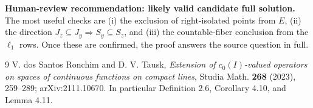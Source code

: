 \documentclass[11pt]{article}
\begin{document}
\textbf{Human-review recommendation: likely valid candidate full solution.}
The most useful checks are (i) the exclusion of right-isolated points from
$E$, (ii) the direction $J_z\subseteq J_y\Rightarrow S_y\subseteq S_z$, and
(iii) the countable-fiber conclusion from the $\ell_1$ rows. Once these are
confirmed, the proof answers the source question in full.

\begin{thebibliography}{9}
V. dos Santos Ronchim and D. V. Tausk,
\emph{Extension of $c_0(I)$-valued operators on spaces of continuous
functions on compact lines}, Studia Math. \textbf{268} (2023), 259--289;
arXiv:2111.10670. In particular Definition 2.6, Corollary 4.10, and
Lemma 4.11.
\end{thebibliography}
\end{document}
